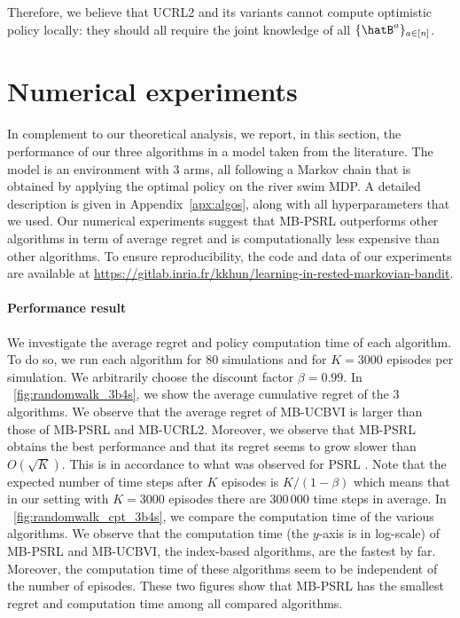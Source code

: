 Therefore, we  believe that UCRL2 and its variants cannot compute optimistic  policy locally: they should all require the joint knowledge of all $\{\hatB^a\}_{a\in[n]}$.


\section{Numerical experiments}
\label{sec:numerical}

In complement to our theoretical analysis, we report, in this section, the performance of our three algorithms in a model taken from the literature. %
The model is an environment with 3 arms, all following a Markov chain that is obtained by applying the optimal policy on the river swim MDP. A detailed description is given in Appendix~\ref{apx:algos}, along with all hyperparameters that we used. Our numerical experiments suggest that MB-PSRL outperforms other algorithms in term of average regret and is computationally less expensive than other algorithms. To ensure reproducibility, the code and data of our experiments are available at \url{https://gitlab.inria.fr/kkhun/learning-in-rested-markovian-bandit}.

\paragraph{Performance result}
We investigate the average regret and policy computation time of each algorithm.
To do so, we run each algorithm for $80$ simulations and for $K=3000$ episodes per simulation. We arbitrarily choose the discount factor $\beta=0.99$. In \figurename~\ref{fig:randomwalk_3b4s}, we show the average cumulative regret of the 3 algorithms. We observe that the average regret of MB-UCBVI is larger than those of MB-PSRL and MB-UCRL2.
Moreover, we observe that MB-PSRL obtains the best performance and that its regret seems to grow slower than $O(\sqrt{K})$. This is in accordance to what was observed for PSRL \cite{osband2013more}. 
Note that the expected number of time steps after $K$ episodes is $K/(1-\beta)$ which means that in our setting with $K=3000$ episodes there are $300\,000$ time steps in average. 
In \figurename~\ref{fig:randomwalk_cpt_3b4s}, we compare the computation time of the various algorithms. We observe that the computation time (the $y$-axis is in log-scale) of MB-PSRL and MB-UCBVI, the index-based algorithms, are the fastest by far. 
Moreover, the computation time of these algorithms seem to be independent of the number of episodes. 
These two figures show that MB-PSRL has the smallest regret and computation time among all compared algorithms.

